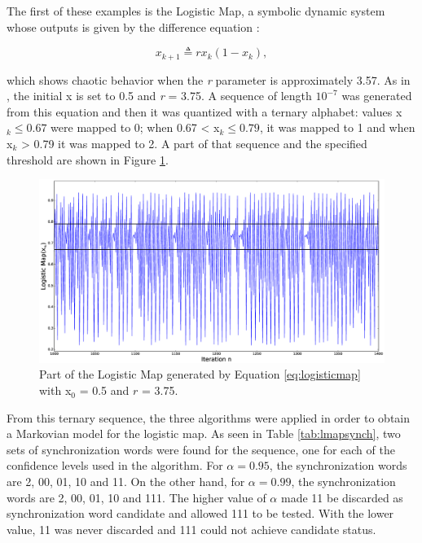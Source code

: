 {The first of these examples is the Logistic Map, a symbolic dynamic system whose outputs is given by the difference equation \cite{asok.14}:

\begin{equation}
x_{k+1} \triangleq rx_k(1-x_k), \label{eq:logisticmap}
\end{equation}


\noindent which shows chaotic behavior when the \textit{r} parameter is approximately 3.57. As in \cite{asok.14}, the initial x is set to 0.5 and \textit{r} = 3.75. A sequence of length $10^{-7}$ was generated from this equation and then it was quantized with a ternary alphabet: values x$_k \leq 0.67$ were mapped to 0; when 0.67 < x$_k \leq 0.79$, it was mapped to 1 and when x$_k$ > 0.79 it was mapped to 2. A part of that sequence and the specified threshold are shown in Figure \ref{fig:lmapseq}.

\begin{figure}
\includegraphics[scale=0.25]{Figuras/logisticmap.eps}
\caption{Part of the Logistic Map generated by Equation \ref{eq:logisticmap} with x$_0$ = 0.5 and $r$ = 3.75.\label{fig:lmapseq}}
\end{figure}

From this ternary sequence, the three algorithms were applied in order to obtain a Markovian model for the logistic map. As seen in Table \ref{tab:lmapsynch}, two sets of synchronization words were found for the sequence, one for each of the confidence levels used in the algorithm. For $\alpha = 0.95$, the synchronization words are 2, 00, 01, 10 and 11. On the other hand, for $\alpha = 0.99$, the synchronization words are 2, 00, 01, 10 and 111. The higher value of $\alpha$ made 11 be discarded as synchronization word candidate and allowed 111 to be tested. With the lower value, 11 was never discarded and 111 could not achieve candidate status.

}
